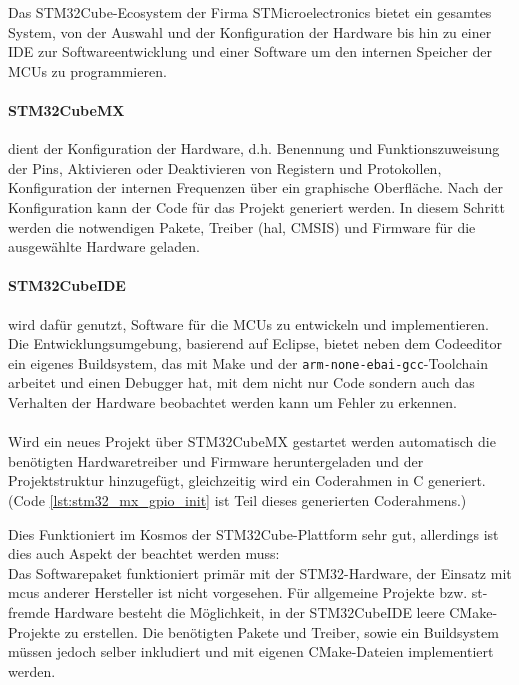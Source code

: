 Das STM32Cube-Ecosystem \cite{stm32cube_ecosystem} der Firma STMicroelectronics bietet ein gesamtes System, von der Auswahl und der Konfiguration der Hardware bis hin zu einer IDE zur Softwareentwicklung und einer Software um den internen Speicher der MCUs zu programmieren.

\paragraph{STM32CubeMX} 
	dient der Konfiguration der Hardware, d.h. Benennung und Funktionszuweisung der Pins, Aktivieren oder Deaktivieren von Registern und Protokollen, Konfiguration der internen Frequenzen über ein graphische Oberfläche.
	Nach der Konfiguration kann der Code für das Projekt generiert werden.
	In diesem Schritt werden die notwendigen Pakete, Treiber (\gls{hal}, CMSIS) und Firmware für die ausgewählte Hardware geladen. \cite{stm32cubemx}

\paragraph{STM32CubeIDE}
	wird dafür genutzt, Software für die MCUs zu entwickeln und implementieren.
	Die Entwicklungsumgebung, basierend auf Eclipse, bietet neben dem Codeeditor ein eigenes Buildsystem, das mit Make und der \texttt{arm-none-ebai-gcc}-Toolchain arbeitet und einen Debugger hat, mit dem nicht nur Code sondern auch das Verhalten der Hardware beobachtet werden kann um Fehler zu erkennen. \cite{stm32cubeide}
\\
\\
Wird ein neues Projekt über STM32CubeMX gestartet werden automatisch die benötigten Hardwaretreiber und Firmware heruntergeladen und der Projektstruktur hinzugefügt, gleichzeitig wird ein Coderahmen in C generiert. (Code \ref{lst:stm32_mx_gpio_init} ist Teil dieses generierten Coderahmens.)

Dies Funktioniert im Kosmos der STM32Cube-Plattform sehr gut, allerdings ist dies auch Aspekt der beachtet werden muss:\\
Das Softwarepaket funktioniert primär mit der STM32-Hardware, der Einsatz mit \gls{mcu}s anderer Hersteller ist nicht vorgesehen.
Für allgemeine Projekte bzw. st-fremde Hardware besteht die Möglichkeit, in der STM32CubeIDE leere CMake-Projekte zu erstellen.
Die benötigten Pakete und Treiber, sowie ein Buildsystem müssen jedoch selber inkludiert und mit eigenen CMake-Dateien implementiert werden.


